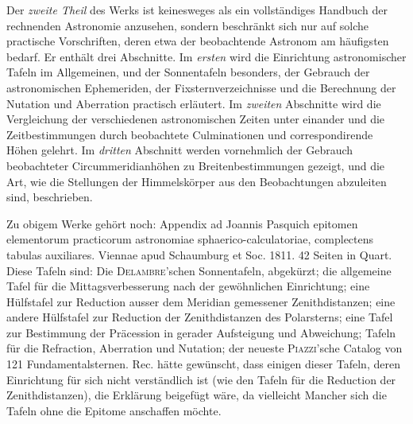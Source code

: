 Der \emph{zweite Theil} des Werks ist keinesweges als ein vollständiges Handbuch der rechnenden Astronomie anzusehen, sondern beschränkt sich nur auf solche practische Vorschriften, deren etwa der beobachtende Astronom am häufigsten bedarf. Er enthält drei Abschnitte. Im \emph{ersten} wird die Einrichtung astronomischer Tafeln im Allgemeinen, und der Sonnentafeln besonders, der Gebrauch der astronomischen Ephemeriden, der Fixsternverzeichnisse und die Berechnung der Nutation und Aberration practisch erläutert. Im \emph{zweiten} Abschnitte wird die Vergleichung der verschiedenen astronomischen Zeiten unter einander und die Zeitbestimmungen durch beobachtete Culminationen und correspondirende Höhen gelehrt. Im \emph{dritten} Abschnitt werden vornehmlich der Gebrauch beobachteter Circummeridianhöhen zu Breitenbestimmungen gezeigt, und die Art, wie die Stellungen der Himmelskörper aus den Beobachtungen abzuleiten sind, beschrieben.

Zu obigem Werke gehört noch: Appendix ad Joannis Pasquich epitomen elementorum practicorum astronomiae sphaerico-calculatoriae, complectens tabulas auxiliares. Viennae apud Schaumburg et Soc. 1811. 42 Seiten in Quart. Diese Tafeln sind: Die \textsc{Delambre}'schen Sonnentafeln, abgekürzt; die allgemeine Tafel für die Mittagsverbesserung nach der gewöhnlichen Einrichtung; eine Hülfstafel zur Reduction ausser dem Meridian gemessener Zenithdistanzen; eine andere Hülfstafel zur Reduction der Zenithdistanzen des Polarsterns; eine Tafel zur Bestimmung der Präcession in gerader Aufsteigung und Abweichung; Tafeln für die Refraction, Aberration und Nutation; der neueste \textsc{Piazzi}'sche Catalog von 121 Fundamentalsternen. Rec. hätte gewünscht, dass einigen dieser Tafeln, deren Einrichtung für sich nicht verständlich ist (wie den Tafeln für die Reduction der Zenithdistanzen), die Erklärung beigefügt wäre, da vielleicht Mancher sich die Tafeln ohne die Epitome anschaffen möchte.
